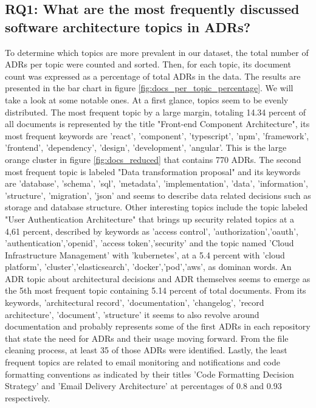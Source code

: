         
        \subsection{RQ1: What are the most frequently discussed software architecture topics in ADRs?}

        To determine which topics are more prevalent in our dataset, the total number of ADRs per topic were counted and sorted. Then, for each topic, its document count was expressed as a percentage of total ADRs in the data. The results are presented in the bar chart in figure \ref{fig:docs_per_topic_percentage}. We will take a look at some notable ones. At a first glance, topics seem to be evenly distributed. The most frequent topic by a large margin, totaling 14.34 percent of all documents is represented by the title "Front-end Component Architecture", its most frequent keywords are 'react', 'component', 'typescript', 'npm', 'framework', 'frontend', 'dependency', 'design', 'development', 'angular'. This is the large orange cluster in figure \ref{fig:docs_reduced} that contains 770 ADRs. The second most frequent topic is labeled "Data transformation proposal" and its keywords are 'database', 'schema', 'sql', 'metadata', 'implementation', 'data', 'information', 'structure', 'migration', 'json' and seems to describe data related decisions such as storage and database structure. Other interesting topics include the topic labeled "User Authentication Architecture" that brings up security related topics at a 4,61 percent, described by keywords as 'access control', 'authorization','oauth', 'authentication','openid', 'access token','security' and the topic named 'Cloud Infrastructure Management' with 'kubernetes', at a 5.4 percent with 'cloud platform', 'cluster','elasticsearch', 'docker','pod','aws', as dominan words. An ADR topic about architectural decisions and ADR themselves seems to emerge as the 5th most frequent topic containing 5.14 percent of total documents. From its keywords, 'architectural record', 'documentation', 'changelog', 'record architecture', 'document', 'structure' it seems to also revolve around documentation and probably represents some of the first ADRs in each repository that state the need for ADRs and their usage moving forward. From the file cleaning process, at least 35 of those ADRs were identified. Lastly, the least frequent topics are related to email monitoring and notifications and code formatting conventions as indicated by their titles 'Code Formatting Decision Strategy' and 'Email Delivery Architecture' at percentages of 0.8 and 0.93 respectively. 

